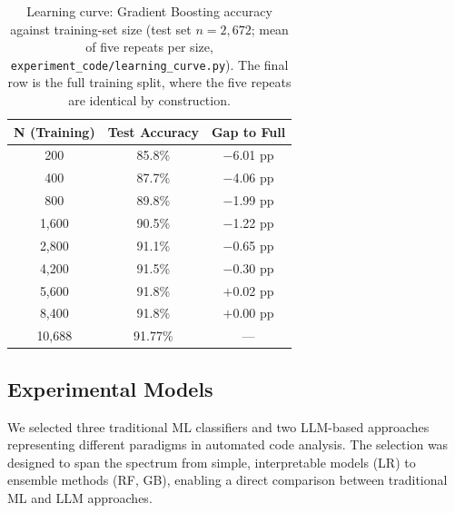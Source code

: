 \documentclass[acmsmall]{acmart}
\begin{document}
\begin{table}[htbp]
\centering
\caption{Learning curve: Gradient Boosting accuracy against training-set size
 (test set $n=2{,}672$; mean of five repeats per size,
 \texttt{experiment\_code/learning\_curve.py}). The final row is the full
 training split, where the five repeats are identical by construction.}
\label{tab:sensitivity}
\begin{tabular}{@{}ccc@{}}
\toprule
N (Training) & Test Accuracy & Gap to Full \\
\midrule
200 & 85.8\% & $-$6.01 pp \\
400 & 87.7\% & $-$4.06 pp \\
800 & 89.8\% & $-$1.99 pp \\
1,600 & 90.5\% & $-$1.22 pp \\
2,800 & 91.1\% & $-$0.65 pp \\
4,200 & 91.5\% & $-$0.30 pp \\
5,600 & 91.8\% & $+$0.02 pp \\
8,400 & 91.8\% & $+$0.00 pp \\
10,688 & 91.77\% & --- \\
\bottomrule
\end{tabular}
\end{table}

\subsection{Experimental Models}\label{sec:models}

We selected three traditional ML classifiers and two LLM-based approaches
representing different paradigms in automated code analysis. The selection was
designed to span the spectrum from simple, interpretable models (LR) to
ensemble methods (RF, GB), enabling a direct comparison between
traditional ML and LLM approaches.
\end{document}
